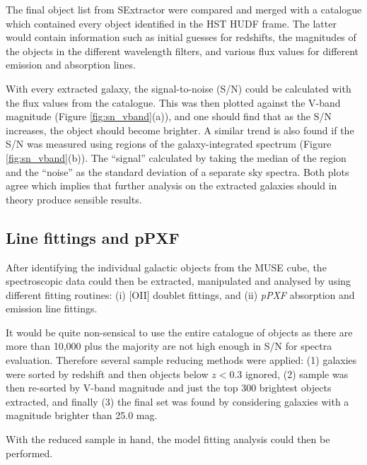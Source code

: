 \documentclass[12pt, twocolumn]{revtex4-1}    %
\begin{document}
The final object list from SExtractor were compared and merged with a catalogue which contained every object identified in the HST HUDF frame. The latter would contain information such as initial guesses for redshifts, the magnitudes of the objects in the different wavelength filters, and various flux values for different emission and absorption lines.


With every extracted galaxy, the signal-to-noise (S/N) could be calculated with the flux values from the catalogue. This was then plotted against the V-band magnitude (Figure \ref{fig:sn_vband}(a)), and one should find that as the S/N increases, the object should become brighter. A similar trend is also found if the S/N was measured using regions of the galaxy-integrated spectrum (Figure \ref{fig:sn_vband}(b)). The ``signal'' calculated by taking the median of the region and the ``noise'' as the standard deviation of a separate sky spectra. Both plots agree which implies that further analysis on the extracted galaxies should in theory produce sensible results. 

\subsection{Line fittings and pPXF} 

After identifying the individual galactic objects from the MUSE cube, the spectroscopic data could then be extracted, manipulated and analysed by using different fitting routines: (i) [OII] doublet fittings, and (ii) \textit{pPXF} absorption and emission line fittings.


It would be quite non-sensical to use the entire catalogue of objects as there are more than 10,000 plus the majority are not high enough in S/N for spectra evaluation. Therefore several sample reducing methods were applied: (1) galaxies were sorted by redshift and then objects below $z<0.3$ ignored, (2) sample was then re-sorted by V-band magnitude and just the top 300 brightest objects extracted, and finally (3) the final set was found by considering galaxies with a magnitude brighter than 25.0 mag. 

With the reduced sample in hand, the model fitting analysis could then be performed.

\end{document}
